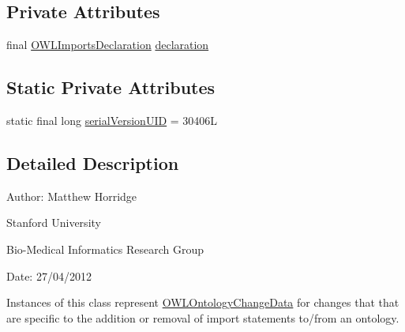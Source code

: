 \subsection*{Private Attributes}
\begin{DoxyCompactItemize}
\item 
final \hyperlink{interfaceorg_1_1semanticweb_1_1owlapi_1_1model_1_1_o_w_l_imports_declaration}{O\-W\-L\-Imports\-Declaration} \hyperlink{classorg_1_1semanticweb_1_1owlapi_1_1change_1_1_import_change_data_a23afda3aff2c6ee273efff9db5bb5315}{declaration}
\end{DoxyCompactItemize}
\subsection*{Static Private Attributes}
\begin{DoxyCompactItemize}
\item 
static final long \hyperlink{classorg_1_1semanticweb_1_1owlapi_1_1change_1_1_import_change_data_a85b4b9503a36d47efb471c0be78c7a89}{serial\-Version\-U\-I\-D} = 30406\-L
\end{DoxyCompactItemize}


\subsection{Detailed Description}
Author\-: Matthew Horridge\par
 Stanford University\par
 Bio-\/\-Medical Informatics Research Group\par
 Date\-: 27/04/2012 

Instances of this class represent \hyperlink{classorg_1_1semanticweb_1_1owlapi_1_1change_1_1_o_w_l_ontology_change_data}{O\-W\-L\-Ontology\-Change\-Data} for changes that that are specific to the addition or removal of import statements to/from an ontology. 

